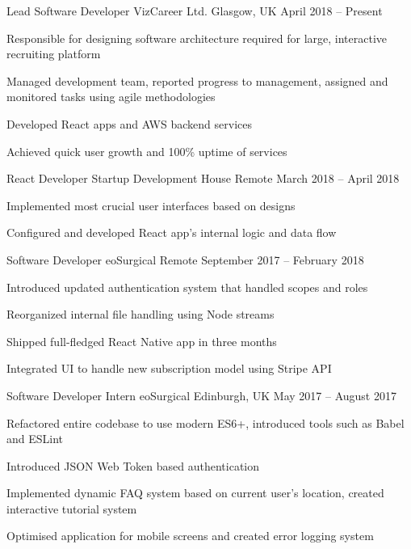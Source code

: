 \documentclass[]{awesome-cv}
\begin{document}
\vspace{-5mm}
\begin{cventries}
  \cventry
  {Lead Software Developer}
  {VizCareer Ltd.}
  {Glasgow, UK}
  {April 2018 – Present}
  {\begin{cvitems}
    \item {Responsible for designing software architecture required for large, interactive recruiting platform}
    \item {Managed development team, reported progress to management, assigned and monitored tasks using agile methodologies}
    \item {Developed React apps and AWS backend services}
    \item {Achieved quick user growth and 100\% uptime of services}
    \end{cvitems}}
	\cventry
	{React Developer}
	{Startup Development House}
	{Remote}
	{March 2018 – April 2018}
	{\begin{cvitems}
		\item {Implemented most crucial user interfaces based on designs}
    \item {Configured and developed React app's internal logic and data flow}
		\end{cvitems}}
  \cventry
  {Software Developer}
  {eoSurgical}
  {Remote}
  {September 2017 – February 2018}
  {\begin{cvitems}
    \item {Introduced updated authentication system that handled scopes and roles}
    \item {Reorganized internal file handling using Node streams}
    \item {Shipped full-fledged React Native app in three months}
    \item {Integrated UI to handle new subscription model using Stripe API}
    \end{cvitems}}
  \cventry
  {Software Developer Intern}
  {eoSurgical}
  {Edinburgh, UK}
  {May 2017 – August 2017}
  {\begin{cvitems}
    \item {Refactored entire codebase to use modern ES6+, introduced tools such as Babel and ESLint}
    \item {Introduced JSON Web Token based authentication}
    \item {Implemented dynamic FAQ system based on current user's location, created interactive tutorial system}
    \item {Optimised application for mobile screens and created error logging system}
    \end{cvitems}}
\end{cventries}
\end{document}
